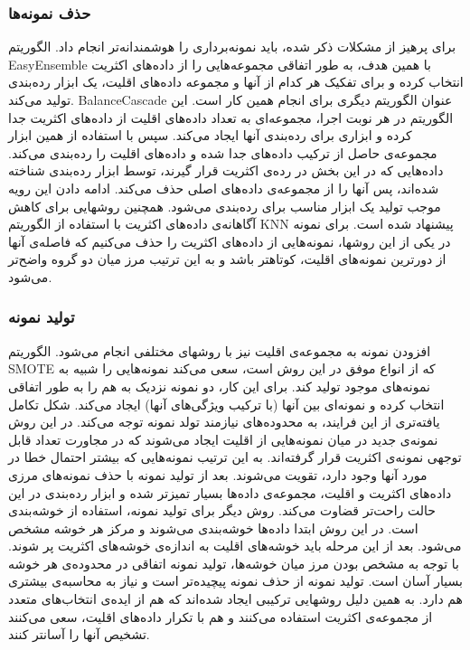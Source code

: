 \documentclass{article}
\begin{document}
\subsubsection{حذف نمونه‌ها}
برای پرهیز از مشکلات ذکر شده، باید نمونه‌برداری را هوشمندانه‌تر انجام داد. الگوریتم EasyEnsemble با همین هدف، به طور اتفاقی مجموعه‌هایی را از داده‌های اکثریت انتخاب کرده و برای تفکیک هر کدام از آنها و مجموعه داده‌های اقلیت، یک ابزار رده‌بندی تولید می‌کند. BalanceCascade عنوان الگوریتم دیگری برای انجام همین کار است. این الگوریتم در هر نوبت اجرا، مجموعه‌ای به تعداد داده‌های اقلیت از داده‌های اکثریت جدا کرده و ابزاری برای رده‌بندی آنها ایجاد می‌کند. سپس با استفاده از همین ابزار مجموعه‌ی حاصل از ترکیب داده‌های جدا شده و داده‌های اقلیت را رده‌بندی می‌کند. داده‌هایی که در این بخش در رده‌ی اکثریت قرار گیرند، توسط ابزار رده‌بندی شناخته شده‌اند، پس آنها را از مجموعه‌ی داده‌های اصلی حذف می‌کند. ادامه دادن این رویه موجب تولید یک ابزار مناسب برای رده‌بندی می‌شود.
همچنین روشهایی برای کاهش آگاهانه‌ی داده‌های اکثریت با استفاده از الگوریتم KNN پیشنهاد شده است. برای نمونه در یکی از این روشها، نمونه‌هایی از داده‌های اکثریت را حذف می‌کنیم که فاصله‌ی آنها از دورترین نمونه‌های اقلیت، کوتاهتر باشد و به این ترتیب مرز میان دو گروه واضح‌تر می‌شود.

\subsubsection{تولید نمونه}
افزودن نمونه به مجموعه‌ی اقلیت نیز با روشهای مختلفی انجام می‌شود. الگوریتم SMOTE که از انواع موفق در این روش است، سعی می‌کند نمونه‌هایی را شبیه به نمونه‌های موجود تولید کند. برای این کار، دو نمونه نزدیک به هم را به طور اتفاقی انتخاب کرده و نمونه‌ای بین آنها (با ترکیب ویژگی‌های آنها) ایجاد می‌کند.
شکل تکامل یافته‌تری از این فرایند، به محدوده‌های نیازمند تولد نمونه توجه می‌کند. در این روش نمونه‌ی جدید در میان نمونه‌هایی از اقلیت ایجاد می‌شوند که در مجاورت تعداد قابل توجهی نمونه‌ی اکثریت قرار گرفته‌اند. به این ترتیب نمونه‌هایی که بیشتر احتمال خطا در مورد آنها وجود دارد، تقویت می‌شوند. بعد از تولید نمونه با حذف نمونه‌های مرزی داده‌های اکثریت و اقلیت، مجموعه‌ی داده‌ها بسیار تمیزتر شده و ابزار رده‌بندی در این حالت راحت‌تر قضاوت می‌کند.
روش دیگر برای تولید نمونه، استفاده از خوشه‌بندی است. در این روش ابتدا داده‌ها خوشه‌بندی می‌شوند و مرکز هر خوشه مشخص می‌شود. بعد از این مرحله باید خوشه‌های اقلیت به اندازه‌ی خوشه‌های اکثریت پر شوند. با توجه به مشخص بودن مرز میان خوشه‌ها، تولید نمونه اتفاقی در محدوده‌ی هر خوشه بسیار آسان است.
تولید نمونه از حذف نمونه پیچیده‌تر است و نیاز به محاسبه‌ی بیشتری هم دارد. به همین دلیل روشهایی ترکیبی ایجاد شده‌اند که هم از ایده‌ی انتخاب‌های متعدد از مجموعه‌ی اکثریت استفاده می‌کنند و هم با تکرار داده‌های اقلیت، سعی می‌کنند تشخیص آنها را آسانتر کنند.
\end{document}
